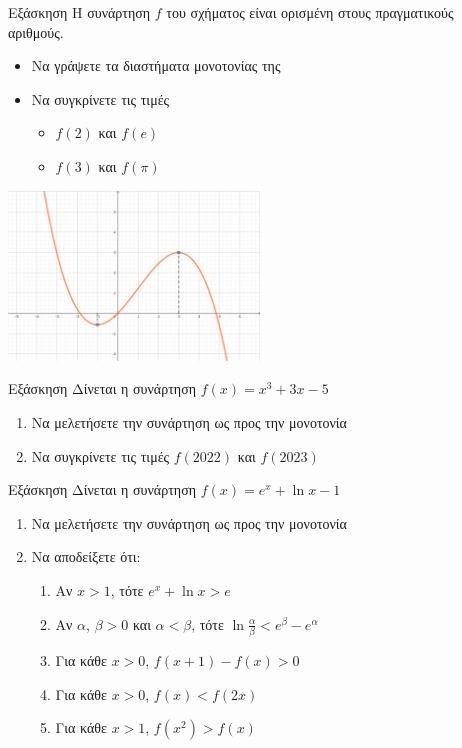 \documentclass[greek]{beamer}
\begin{document}
\begin{frame}{Εξάσκηση}
 Η συνάρτηση $f$ του σχήματος είναι ορισμένη στους πραγματικούς αριθμούς.
 \begin{itemize}
  \item Να γράψετε τα διαστήματα μονοτονίας της
  \item Να συγκρίνετε τις τιμές
        \begin{itemize}
         \item $f(2)$ και $f(e)$
         \item $f(3)$ και $f(\pi)$
        \end{itemize}
 \end{itemize}
 \centering
 \includegraphics[width=0.5\textwidth]{"images/1.3 Μονοτονία.png"}
\end{frame}

\begin{frame}{Εξάσκηση}
 Δίνεται η συνάρτηση $f(x)=x^3+3x-5$
 \begin{enumerate}
  \item Να μελετήσετε την συνάρτηση ως προς την μονοτονία \pause
  \item Να συγκρίνετε τις τιμές $f(2022)$ και $f(2023)$
 \end{enumerate}
\end{frame}

\begin{frame}{Εξάσκηση}
 Δίνεται η συνάρτηση $f(x)=e^x+\ln x-1$
 \begin{enumerate}
  \item Να μελετήσετε την συνάρτηση ως προς την μονοτονία \pause
  \item Να αποδείξετε ότι:
        \begin{enumerate}
         \item Αν $x>1$, τότε $e^x+\ln x>e$ \pause
         \item Αν $α$, $β>0$ και $α<β$, τότε $\ln \frac{α}{β}<e^β-e^α$ \pause
         \item Για κάθε $x>0$, $f(x+1)-f(x)>0$ \pause
         \item Για κάθε $x>0$, $f(x)<f(2x)$ \pause
         \item Για κάθε $x>1$, $f(x^2)>f(x)$
        \end{enumerate}
 \end{enumerate}
\end{frame}
\end{document}
